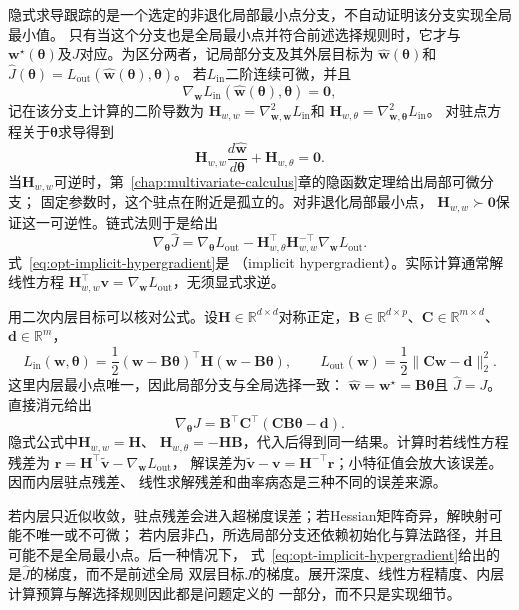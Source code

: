 隐式求导跟踪的是一个选定的非退化局部最小点分支，不自动证明该分支实现全局最小值。
只有当这个分支也是全局最小点并符合前述选择规则时，它才与
$\bm{w}^{\star}(\bm{\theta})$及$J$对应。为区分两者，记局部分支及其外层目标为
$\widehat{\bm{w}}(\bm{\theta})$和
$\widehat{J}(\bm{\theta})
=L_{\mathrm{out}}(\widehat{\bm{w}}(\bm{\theta}),\bm{\theta})$。
若$L_{\mathrm{in}}$二阶连续可微，并且
\[
  \nabla_{\bm{w}}L_{\mathrm{in}}
  (\widehat{\bm{w}}(\bm{\theta}),\bm{\theta})=\bm{0},
\]
记在该分支上计算的二阶导数为
$\bm{H}_{w,w}=\nabla_{\bm{w},\bm{w}}^2L_{\mathrm{in}}$和
$\bm{H}_{w,\theta}=\nabla_{\bm{w},\bm{\theta}}^2L_{\mathrm{in}}$。
对驻点方程关于$\bm{\theta}$求导得到
\[
  \bm{H}_{w,w}\frac{d\widehat{\bm{w}}}{d\bm{\theta}}
  +\bm{H}_{w,\theta}=\bm{0}.
\]
当$\bm{H}_{w,w}$可逆时，第~\ref{chap:multivariate-calculus}章的隐函数定理给出局部可微分支；
固定参数时，这个驻点在附近是孤立的。对非退化局部最小点，
$\bm{H}_{w,w}\succ\bm{0}$保证这一可逆性。链式法则于是给出
\begin{equation}
  \nabla_{\bm{\theta}}\widehat{J}
  =
  \nabla_{\bm{\theta}}L_{\mathrm{out}}
  -\bm{H}_{w,\theta}^{\top}
  \bm{H}_{w,w}^{-\top}
  \nabla_{\bm{w}}L_{\mathrm{out}}.
  \label{eq:opt-implicit-hypergradient}
\end{equation}
式~\eqref{eq:opt-implicit-hypergradient}是
（implicit hypergradient）。实际计算通常解线性方程
$\bm{H}_{w,w}^{\top}\bm{v}=\nabla_{\bm{w}}L_{\mathrm{out}}$，无须显式求逆。

用二次内层目标可以核对公式。设$\bm H\in\mathbb R^{d\times d}$对称正定，$\bm B\in\mathbb R^{d\times p}$、$\bm C\in\mathbb R^{m\times d}$、$\bm d\in\mathbb R^m$，
\[
  L_{\mathrm{in}}(\bm{w},\bm{\theta})
  =\frac12(\bm{w}-\bm{B}\bm{\theta})^{\top}
  \bm{H}(\bm{w}-\bm{B}\bm{\theta}),\qquad
  L_{\mathrm{out}}(\bm{w})
  =\frac12\lVert\bm{C}\bm{w}-\bm{d}\rVert_2^2.
\]
这里内层最小点唯一，因此局部分支与全局选择一致：
$\widehat{\bm{w}}=\bm{w}^{\star}=\bm{B}\bm{\theta}$且
$\widehat{J}=J$。直接消元给出
\[
  \nabla_{\bm{\theta}}J
  =\bm{B}^{\top}\bm{C}^{\top}
  (\bm{C}\bm{B}\bm{\theta}-\bm{d}).
\]
隐式公式中$\bm{H}_{w,w}=\bm{H}$、
$\bm{H}_{w,\theta}=-\bm{H}\bm{B}$，代入后得到同一结果。计算时若线性方程残差为
$\bm r=\bm H^\top\widetilde{\bm v}-\nabla_{\bm w}L_{\mathrm{out}}$，
解误差为$\widetilde{\bm v}-\bm v=\bm{H}^{-\top}\bm{r}$；小特征值会放大该误差。因而内层驻点残差、
线性求解残差和曲率病态是三种不同的误差来源。

若内层只近似收敛，驻点残差会进入超梯度误差；若Hessian矩阵奇异，解映射可能不唯一或不可微；
若内层非凸，所选局部分支还依赖初始化与算法路径，并且可能不是全局最小点。后一种情况下，
式~\eqref{eq:opt-implicit-hypergradient}给出的是$\widehat{J}$的梯度，而不是前述全局
双层目标$J$的梯度。展开深度、线性方程精度、内层计算预算与解选择规则因此都是问题定义的
一部分，而不只是实现细节。

